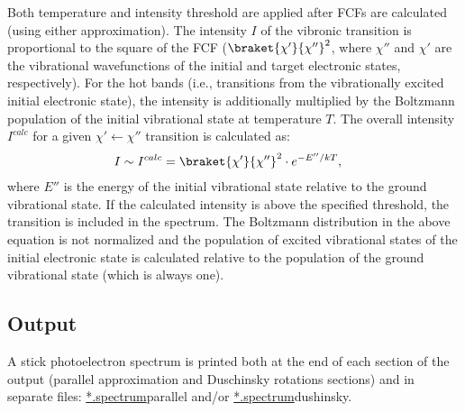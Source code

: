 \documentclass[11pt]{article}
\begin{document}
Both temperature and intensity threshold are applied after FCFs are calculated
(using either approximation).
The intensity $I$ of the vibronic transition is proportional to the square of the FCF 
($\braket{\chi '}{\chi''}^2$, where $\chi''$ and $\chi '$ are the 
vibrational wavefunctions of the initial and target electronic states, respectively).
For the hot bands (i.e., transitions from the vibrationally excited initial electronic state),
the intensity is additionally multiplied by the Boltzmann population of the
initial vibrational state at temperature $T$. 
The overall intensity $I^{calc}$ for a given $\chi ' \leftarrow \chi''$ transition
is calculated as:
\begin{align}
I\sim I^{calc}&=\braket{\chi '}{\chi''}^2\cdot e^{-E''/kT},
\label{eq:intens}
\end{align}
where $E''$ is the energy of the initial vibrational state relative to the ground vibrational state.
If the calculated intensity is above the specified threshold, the transition is included in the spectrum.
The Boltzmann distribution in the above equation is not normalized and the population of excited vibrational
states of the initial electronic state is calculated relative to the population of the ground vibrational
state (which is always one). 



\subsection{Output}
\label{sec:output}

A stick photoelectron spectrum is printed both at the end of each section of the output 
(parallel approximation and Duschinsky rotations sections)
and in separate files: \ul{*.spectrum}{parallel} and/or \ul{*.spectrum}{dushinsky}.
\end{document}
